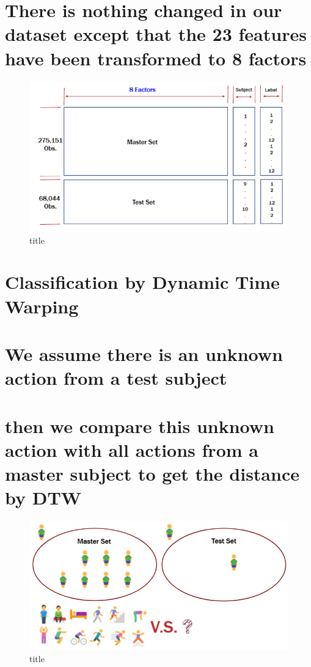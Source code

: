 \documentclass[11pt]{article}
\makeatletter
\def\maxwidth{\ifdim\Gin@nat@width>\linewidth\linewidth
    \else\Gin@nat@width\fi}
\let\Oldincludegraphics\includegraphics
\renewcommand{\includegraphics}[1]{\Oldincludegraphics[width=.8\maxwidth]{#1}}
\makeatother
\begin{document}
    \section{There is nothing changed in our dataset except that the 23
features have been transformed to 8
factors}\label{there-is-nothing-changed-in-our-dataset-except-that-the-23-features-have-been-transformed-to-8-factors}

    \begin{figure}
\centering
\includegraphics{img/after_dimension_reduction.png}
\caption{title}
\end{figure}

    \section{Classification by Dynamic Time
Warping}\label{classification-by-dynamic-time-warping}

    \section{We assume there is an unknown action from a test
subject}\label{we-assume-there-is-an-unknown-action-from-a-test-subject}

\section{then we compare this unknown action with all actions from a
master subject to get the distance by
DTW}\label{then-we-compare-this-unknown-action-with-all-actions-from-a-master-subject-to-get-the-distance-by-dtw}

\begin{figure}
\centering
\includegraphics{img/compare_1_subject.png}
\caption{title}
\end{figure}
\end{document}
